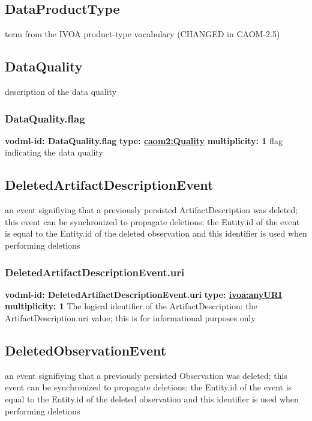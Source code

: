   \subsection{DataProductType}
  \label{sect:DataProductType}
    term from the IVOA product-type vocabulary (CHANGED in CAOM-2.5)

  \subsection{DataQuality}
  \label{sect:DataQuality}
    description of the data quality

    \subsubsection{DataQuality.flag}
      \textbf{vodml-id: DataQuality.flag} \newline
      \textbf{type: \hyperref[sect:Quality]{caom2:Quality}} \newline
      \textbf{multiplicity: 1} \newline
      flag indicating the data quality

  \subsection{DeletedArtifactDescriptionEvent}
  \label{sect:DeletedArtifactDescriptionEvent}
    an event signifiying that a previously persisted ArtifactDescription was deleted; this event can be synchronized to propagate deletions; the Entity.id of the event is equal to the Entity.id of the deleted observation and this identifier is used when performing deletions

    \subsubsection{DeletedArtifactDescriptionEvent.uri}
      \textbf{vodml-id: DeletedArtifactDescriptionEvent.uri} \newline
      \textbf{type: \hyperref[sect:ivoa]{ivoa:anyURI}} \newline
      \textbf{multiplicity: 1} \newline
      The logical identifier of the ArtifactDescription: the ArtifactDescription.uri value; this is for informational purposes only

  \subsection{DeletedObservationEvent}
  \label{sect:DeletedObservationEvent}
    an event signifiying that a previously persisted Observation was deleted; this event can be synchronized to propagate deletions; the Entity.id of the event is equal to the Entity.id of the deleted observation and this identifier is used when performing deletions

